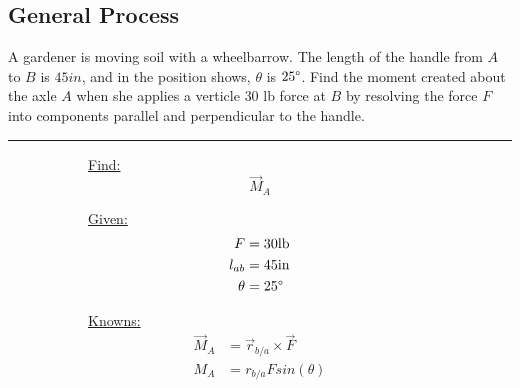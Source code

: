\documentclass[12pt]{article}
\begin{document}
\subsection{General Process}
\label{ssec:generalProcess}


\newpage

\begin{example}
  \begin{wrapfigure}[]{r}{0.3\textwidth}
    \centering
    
  \end{wrapfigure}

  A gardener is moving soil with a wheelbarrow. The length of the handle from $A$ to $B$ is
  $45in$, and in the position shows, $\theta$ is $25 \degree$. Find the moment created about
  the axle $A$ when she applies a verticle $30$ lb force at $B$ by resolving the force $F$
  into components parallel and perpendicular to the handle.

  \vspace{22pt}
  \hrule
  \vspace{12pt}

  \begin{figure}[H]
    \centering
    \begin{subfigure}[t]{0.2\textwidth}
      \centering
      \uline{Find:}
      \begin{equation*}
        \overrightarrow{M}_A
      \end{equation*}
    \end{subfigure}
    \vrule
    \begin{subfigure}[t]{0.3\textwidth}
      \centering
      \uline{Given:}
      \begin{align*}
        F &= 30 \textup{lb} \\
        l_{ab} &= 45 \textup{in} \\
        \theta &= 25 \degree
      \end{align*}
    \end{subfigure}
    \vrule
    \begin{subfigure}[t]{0.4\textwidth}
      \centering
      \uline{Knowns:}
      \begin{align*}
        \overrightarrow{M}_A &= \overrightarrow{r}_{b/a} \times \overrightarrow{F} \\
        M_A &= r_{b/a} F sin(\theta)
      \end{align*}
    \end{subfigure}
  \end{figure}


\end{example}
\end{document}
